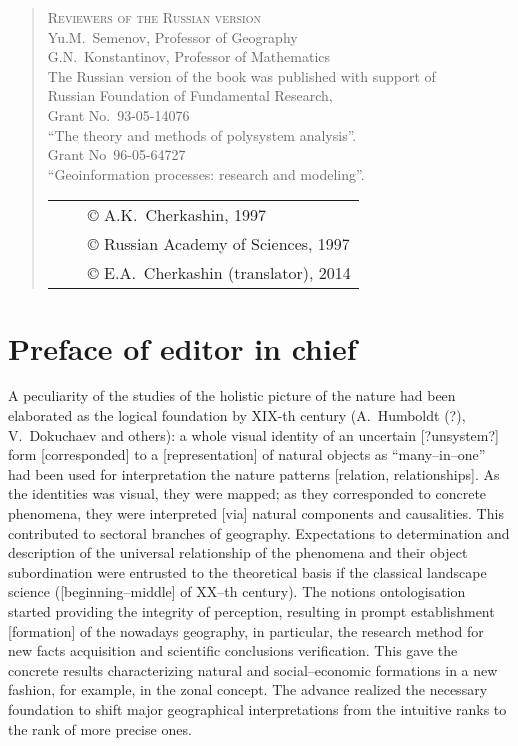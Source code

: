 \documentclass[12pt,leqno]{book}
\begin{document}
\begin{quote}
\begin{center}
\textsc{Reviewers of the Russian version}\\{}
Yu.M.~Semenov, Professor of Geography\\{}
G.N.~Konstantinov, Professor of Mathematics\\{}
\vspace{1em}
The Russian version of the book was published with support of\\{} Russian Foundation of Fundamental Research,\\{}
Grant No.~93-05-14076\\{}
``The theory and methods of polysystem analysis''.\\{}
Grant No~96-05-64727\\{}
``Geoinformation processes: research and modeling''.
\end{center}
\vfill{}
\begin{tabular}{lcl}
{}\hspace{0.4\linewidth}{} & & \copyright{} A.K.~Cherkashin, 1997\\
& & \copyright{} Russian Academy of Sciences, 1997\\
& & \copyright{} E.A.~Cherkashin (translator), 2014
\end{tabular}
\end{quote}

\tableofcontents

\chapter*{Preface of editor in chief}\normalsize
\pagestyle{plain}



A peculiarity of the studies of the holistic picture of the nature had been elaborated as the logical foundation by XIX-th century (A.~Humboldt (?), V.~Dokuchaev and others): a whole visual identity of an uncertain [?unsystem?] form [corresponded] to a [representation] of natural objects as ``many--in--one'' had been used for interpretation the nature patterns [relation, relationships]. As the identities was visual, they were mapped; as they corresponded to concrete phenomena, they were interpreted [via] natural components and causalities. This contributed to sectoral branches of geography. Expectations to determination and description of the universal relationship of the phenomena and their object subordination were entrusted to the theoretical basis if the classical landscape science ([beginning--middle] of XX--th century). The notions ontologisation started providing the integrity of perception, resulting in prompt establishment [formation] of the nowadays geography, in particular, the research method for new facts acquisition and scientific conclusions verification. This gave the concrete results characterizing natural and social--economic formations in a new fashion, for example, in the zonal concept. The advance realized the necessary foundation to shift major geographical interpretations from the intuitive ranks to the rank of more precise ones.
\end{document}
